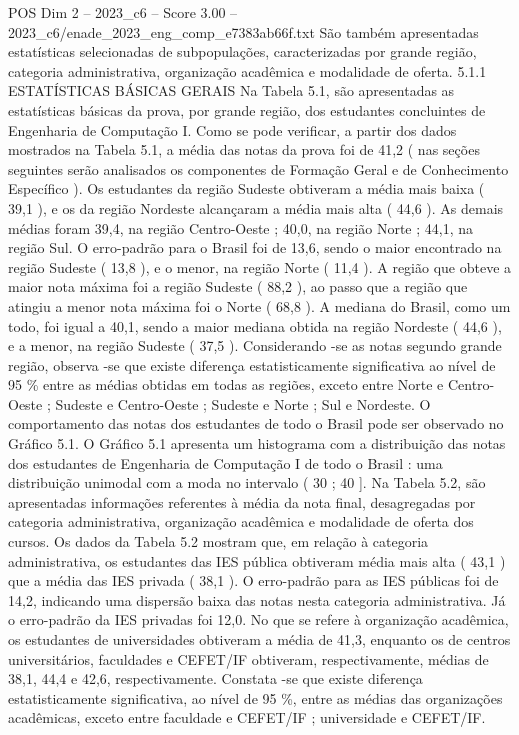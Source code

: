 \begin{textsample}{POS Dim 2 – 2023\_c6 – Score 3.00 – 2023\_c6/enade\_2023\_eng\_comp\_e7383ab66f.txt}
São também apresentadas estatísticas selecionadas de subpopulações, caracterizadas por grande região, categoria administrativa, organização acadêmica e modalidade de oferta. 5.1.1 ESTATÍSTICAS BÁSICAS GERAIS Na Tabela 5.1, são apresentadas as estatísticas básicas da prova, por grande região, dos estudantes concluintes de Engenharia de Computação I.
Como se pode verificar, a partir dos dados mostrados na Tabela 5.1, a média das notas da prova foi de 41,2 ( nas seções seguintes serão analisados os componentes de Formação Geral e de Conhecimento Específico ).
Os estudantes da região Sudeste obtiveram a média mais baixa ( 39,1 ), e os da região Nordeste alcançaram a média mais alta ( 44,6 ).
As demais médias foram 39,4, na região Centro-Oeste ; 40,0, na região Norte ; 44,1, na região Sul.
O erro-padrão para o Brasil foi de 13,6, sendo o maior encontrado na região Sudeste ( 13,8 ), e o menor, na região Norte ( 11,4 ).
A região que obteve a maior nota máxima foi a região Sudeste ( 88,2 ), ao passo que a região que atingiu a menor nota máxima foi o Norte ( 68,8 ).
A mediana do Brasil, como um todo, foi igual a 40,1, sendo a maior mediana obtida na região Nordeste ( 44,6 ), e a menor, na região Sudeste ( 37,5 ).
Considerando -se as notas segundo grande região, observa -se que existe diferença estatisticamente significativa ao nível de 95 \% entre as médias obtidas em todas as regiões, exceto entre Norte e Centro-Oeste ; Sudeste e Centro-Oeste ; Sudeste e Norte ; Sul e Nordeste.
O comportamento das notas dos estudantes de todo o Brasil pode ser observado no Gráfico 5.1.
O Gráfico 5.1 apresenta um histograma com a distribuição das notas dos estudantes de Engenharia de Computação I de todo o Brasil : uma distribuição unimodal com a moda no intervalo ( 30 ; 40 ].
Na Tabela 5.2, são apresentadas informações referentes à média da nota final, desagregadas por categoria administrativa, organização acadêmica e modalidade de oferta dos cursos.
Os dados da Tabela 5.2 mostram que, em relação à categoria administrativa, os estudantes das IES pública obtiveram média mais alta ( 43,1 ) que a média das IES privada ( 38,1 ).
O erro-padrão para as IES públicas foi de 14,2, indicando uma dispersão baixa das notas nesta categoria administrativa.
Já o erro-padrão da IES privadas foi 12,0.
No que se refere à organização acadêmica, os estudantes de universidades obtiveram a média de 41,3, enquanto os de centros universitários, faculdades e CEFET/IF obtiveram, respectivamente, médias de 38,1, 44,4 e 42,6, respectivamente.
Constata -se que existe diferença estatisticamente significativa, ao nível de 95 \%, entre as médias das organizações acadêmicas, exceto entre faculdade e CEFET/IF ; universidade e CEFET/IF.

\end{textsample}
